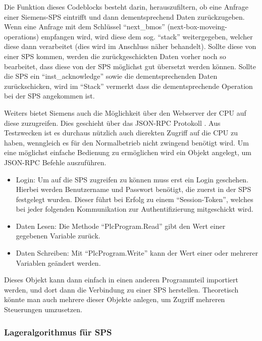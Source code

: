 Die Funktion dieses Codeblocks besteht darin, herauszufiltern, ob eine Anfrage einer Siemens-SPS eintrifft und dann dementsprechend Daten zurückzugeben.
Wenn eine Anfrage mit dem Schlüssel \enquote{next\_bmos} (next-box-moveing-operations) empfangen wird, wird diese dem sog. \enquote{stack} weitergegeben, welcher diese dann verarbeitet (dies wird im Anschluss näher behandelt). Sollte diese von einer SPS kommen, werden die zurückgeschickten Daten vorher noch so bearbeitet, dass diese von der SPS möglichst gut übersetzt werden können.
Sollte die SPS ein \enquote{inst\_acknowledge} sowie die dementsprechenden Daten zurückschicken, wird im \enquote{Stack} vermerkt dass die dementsprechende Operation bei der SPS angekommen ist.

Weiters bietet Siemens auch die Möglichkeit über den Webserver der CPU auf diese zuzugreifen. Dies geschieht über das JSON-RPC Protokoll \cite{ws_s7}. Aus Testzwecken ist es durchaus nützlich auch dierekten Zugriff auf die CPU zu haben, wenngleich es für den Normalbetrieb nicht zwingend benötigt wird. Um eine möglichst einfache Bedienung zu ermöglichen wird ein Objekt angelegt, um JSON-RPC Befehle auszuführen.

\begin{itemize}
    \item Login: Um auf die SPS zugreifen zu können muss erst ein Login geschehen. Hierbei werden Benutzername und Passwort benötigt, die zuerst in der SPS festgelegt wurden. Dieser führt bei Erfolg zu einem \enquote{Session-Token}, welches bei jeder folgenden Kommunikation zur Authentifizierung mitgeschickt wird.
    \item Daten Lesen: Die Methode \enquote{PlcProgram.Read} gibt den Wert einer gegebenen Variable zurück.
    \item Daten Schreiben: Mit \enquote{PlcProgram.Write} kann der Wert einer oder mehrerer Variablen geändert werden.
\end{itemize}

Dieses Objekt kann dann einfach in einen anderen Programmteil importiert werden, und dort dann die Verbindung zu einer SPS herstellen. Theoretisch könnte man auch mehrere dieser Objekte anlegen, um Zugriff mehreren Steuerungen umzusetzen.

\subsubsection{Lageralgorithmus für SPS}\mbox{}\\

